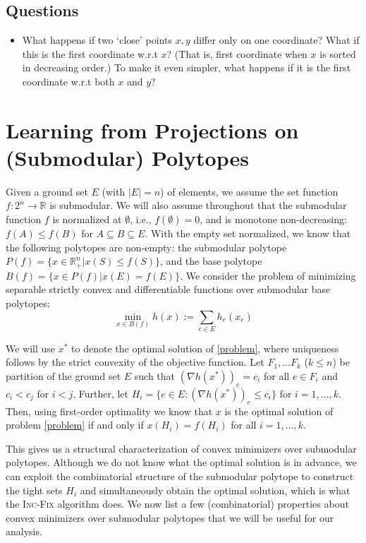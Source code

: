 \documentclass{article}
\begin{document}
\newpage
\subsection*{Questions}

\begin{itemize}
    \item What happens if two `close' points $x, y$ differ only on one coordinate? What if this is the first coordinate w.r.t $x$? (That is, first coordinate when $x$ is sorted in decreasing order.) To make it even simpler, what happens if it is the first coordinate w.r.t both $x$ and $y$?
\end{itemize}

\newpage

\section*{Learning from Projections on (Submodular) Polytopes}
Given a ground set $E$ (with $|E|=n$) of elements, we assume the set function $f: 2^n \to \mathbb{R}$ is submodular. We will also assume throughout that the submodular function $f$ is normalized at $\emptyset$, i.e., $f(\emptyset)=0$, and is monotone non-decreasing: $f(A) \leq f(B)$ for $A \subseteq B \subseteq E$. With the empty set normalized, we know that the following polytopes are non-empty: the submodular polytope $P(f) = \{x \in \mathbb{R}_+^n | x(S) \leq f(S)\}$, and the base polytope $B(f) = \{x \in P(f) | x(E) = f(E)\}$. We consider the problem of minimizing
separable strictly convex and differentiable functions over submodular base polytopes:
\begin{equation}\label{problem}
    \min_{x \in B(f)} h(x):= \sum_{e \in E} h_e(x_e)
\end{equation}

We will use $x^*$ to denote the optimal solution of \eqref{problem}, where uniqueness follows by the strict convexity of the objective function. Let $F_1,\dots F_k$ ($k \leq n$) be partition of the ground set $E$ such that $(\nabla h(x^*))_e = c_i$ for all $e \in F_i$ and $c_i < c_j$ for $i<j$. Further, let $H_i = \{e \in E : (\nabla h(x^*))_e \leq c_i\}$ for $i= 1, \dots,k$. Then, using first-order optimality we know that $x$ is the optimal solution of problem \eqref{problem} if and only if $x(H_i) = f (H_i)$ for all $i= 1, \dots,k$.

This gives us a structural characterization of convex minimizers over submodular polytopes. Although we do not know what the optimal solution is in advance, we can exploit the combinatorial structure of the submodular polytope to construct the tight sets $H_i$ and simultaneously obtain the optimal solution, which is what the \textsc{Inc-Fix} algorithm does. We now list a few (combinatorial) properties about convex minimizers over submodular polytopes that we will be useful for our analysis.
\end{document}
